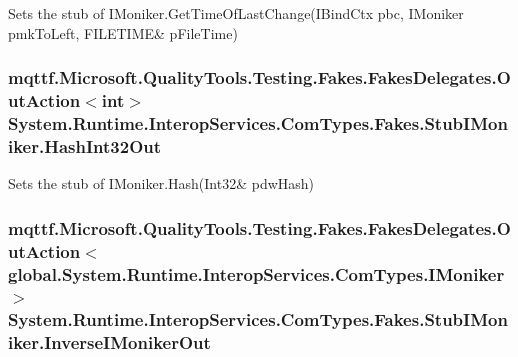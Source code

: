 Sets the stub of I\-Moniker.\-Get\-Time\-Of\-Last\-Change(I\-Bind\-Ctx pbc, I\-Moniker pmk\-To\-Left, F\-I\-L\-E\-T\-I\-M\-E\& p\-File\-Time)

\hypertarget{class_system_1_1_runtime_1_1_interop_services_1_1_com_types_1_1_fakes_1_1_stub_i_moniker_abd0ad8f52ef8b970f1947a7218482675}{
\subsubsection[{Hash\-Int32\-Out}]{\setlength{\rightskip}{0pt plus 5cm}mqttf.\-Microsoft.\-Quality\-Tools.\-Testing.\-Fakes.\-Fakes\-Delegates.\-Out\-Action$<$int$>$ System.\-Runtime.\-Interop\-Services.\-Com\-Types.\-Fakes.\-Stub\-I\-Moniker.\-Hash\-Int32\-Out}}\label{class_system_1_1_runtime_1_1_interop_services_1_1_com_types_1_1_fakes_1_1_stub_i_moniker_abd0ad8f52ef8b970f1947a7218482675}


Sets the stub of I\-Moniker.\-Hash(Int32\& pdw\-Hash)

\hypertarget{class_system_1_1_runtime_1_1_interop_services_1_1_com_types_1_1_fakes_1_1_stub_i_moniker_a11f3c17dae79f09d9024e707bec1a5cf}{
\subsubsection[{Inverse\-I\-Moniker\-Out}]{\setlength{\rightskip}{0pt plus 5cm}mqttf.\-Microsoft.\-Quality\-Tools.\-Testing.\-Fakes.\-Fakes\-Delegates.\-Out\-Action$<$global.\-System.\-Runtime.\-Interop\-Services.\-Com\-Types.\-I\-Moniker$>$ System.\-Runtime.\-Interop\-Services.\-Com\-Types.\-Fakes.\-Stub\-I\-Moniker.\-Inverse\-I\-Moniker\-Out}}\label{class_system_1_1_runtime_1_1_interop_services_1_1_com_types_1_1_fakes_1_1_stub_i_moniker_a11f3c17dae79f09d9024e707bec1a5cf}


